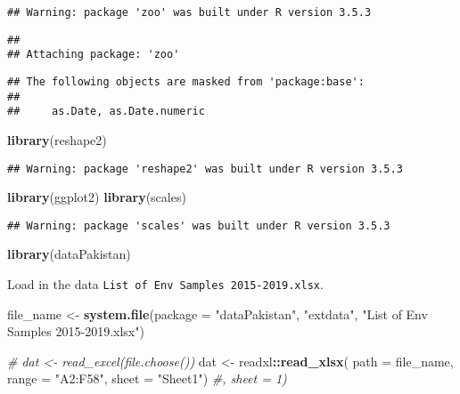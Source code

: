\documentclass[]{article}
\newenvironment{Shaded}{\begin{snugshade}}{\end{snugshade}}
\newcommand{\CommentTok}[1]{\textcolor[rgb]{0.56,0.35,0.01}{\textit{#1}}}
\newcommand{\DataTypeTok}[1]{\textcolor[rgb]{0.13,0.29,0.53}{#1}}
\newcommand{\KeywordTok}[1]{\textcolor[rgb]{0.13,0.29,0.53}{\textbf{#1}}}
\newcommand{\NormalTok}[1]{#1}
\newcommand{\OperatorTok}[1]{\textcolor[rgb]{0.81,0.36,0.00}{\textbf{#1}}}
\newcommand{\StringTok}[1]{\textcolor[rgb]{0.31,0.60,0.02}{#1}}
\begin{document}
\begin{verbatim}
## Warning: package 'zoo' was built under R version 3.5.3
\end{verbatim}

\begin{verbatim}
## 
## Attaching package: 'zoo'
\end{verbatim}

\begin{verbatim}
## The following objects are masked from 'package:base':
## 
##     as.Date, as.Date.numeric
\end{verbatim}

\begin{Shaded}
\begin{Highlighting}[]
\KeywordTok{library}\NormalTok{(reshape2)}
\end{Highlighting}
\end{Shaded}

\begin{verbatim}
## Warning: package 'reshape2' was built under R version 3.5.3
\end{verbatim}

\begin{Shaded}
\begin{Highlighting}[]
\KeywordTok{library}\NormalTok{(ggplot2)}
\KeywordTok{library}\NormalTok{(scales)}
\end{Highlighting}
\end{Shaded}

\begin{verbatim}
## Warning: package 'scales' was built under R version 3.5.3
\end{verbatim}

\begin{Shaded}
\begin{Highlighting}[]
\KeywordTok{library}\NormalTok{(dataPakistan)}
\end{Highlighting}
\end{Shaded}

Load in the data \texttt{List\ of\ Env\ Samples\ 2015-2019.xlsx}.

\begin{Shaded}
\begin{Highlighting}[]
\NormalTok{file_name <-}\StringTok{ }\KeywordTok{system.file}\NormalTok{(}\DataTypeTok{package =} \StringTok{"dataPakistan"}\NormalTok{, }\StringTok{"extdata"}\NormalTok{, }\StringTok{"List of Env Samples 2015-2019.xlsx"}\NormalTok{)}

\CommentTok{# dat <- read_excel(file.choose())}
\NormalTok{dat <-}
\StringTok{  }\NormalTok{readxl}\OperatorTok{::}\KeywordTok{read_xlsx}\NormalTok{(}
    \DataTypeTok{path =}\NormalTok{ file_name,}
    \DataTypeTok{range =} \StringTok{"A2:F58"}\NormalTok{, }
    \DataTypeTok{sheet =} \StringTok{"Sheet1"}\NormalTok{) }\CommentTok{#, sheet = 1)}
\end{Highlighting}
\end{Shaded}
\end{document}
